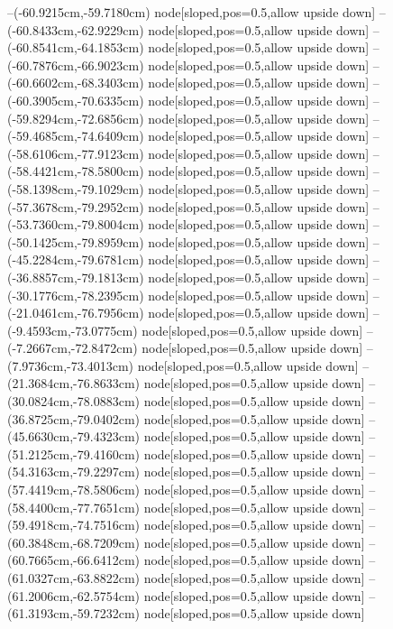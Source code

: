 --(-60.9215cm,-59.7180cm) node[sloped,pos=0.5,allow upside down]{\ArrowIn}
--(-60.8433cm,-62.9229cm) node[sloped,pos=0.5,allow upside down]{\ArrowIn}
--(-60.8541cm,-64.1853cm) node[sloped,pos=0.5,allow upside down]{\ArrowIn}
--(-60.7876cm,-66.9023cm) node[sloped,pos=0.5,allow upside down]{\ArrowIn}
--(-60.6602cm,-68.3403cm) node[sloped,pos=0.5,allow upside down]{\ArrowIn}
--(-60.3905cm,-70.6335cm) node[sloped,pos=0.5,allow upside down]{\ArrowIn}
--(-59.8294cm,-72.6856cm) node[sloped,pos=0.5,allow upside down]{\ArrowIn}
--(-59.4685cm,-74.6409cm) node[sloped,pos=0.5,allow upside down]{\ArrowIn}
--(-58.6106cm,-77.9123cm) node[sloped,pos=0.5,allow upside down]{\ArrowIn}
--(-58.4421cm,-78.5800cm) node[sloped,pos=0.5,allow upside down]{\arrowIn}
--(-58.1398cm,-79.1029cm) node[sloped,pos=0.5,allow upside down]{\arrowIn}
--(-57.3678cm,-79.2952cm) node[sloped,pos=0.5,allow upside down]{\arrowIn}
--(-53.7360cm,-79.8004cm) node[sloped,pos=0.5,allow upside down]{\ArrowIn}
--(-50.1425cm,-79.8959cm) node[sloped,pos=0.5,allow upside down]{\ArrowIn}
--(-45.2284cm,-79.6781cm) node[sloped,pos=0.5,allow upside down]{\ArrowIn}
--(-36.8857cm,-79.1813cm) node[sloped,pos=0.5,allow upside down]{\ArrowIn}
--(-30.1776cm,-78.2395cm) node[sloped,pos=0.5,allow upside down]{\ArrowIn}
--(-21.0461cm,-76.7956cm) node[sloped,pos=0.5,allow upside down]{\ArrowIn}
--(-9.4593cm,-73.0775cm) node[sloped,pos=0.5,allow upside down]{\ArrowIn}
--(-7.2667cm,-72.8472cm) node[sloped,pos=0.5,allow upside down]{\ArrowIn}
--(7.9736cm,-73.4013cm) node[sloped,pos=0.5,allow upside down]{\ArrowIn}
--(21.3684cm,-76.8633cm) node[sloped,pos=0.5,allow upside down]{\ArrowIn}
--(30.0824cm,-78.0883cm) node[sloped,pos=0.5,allow upside down]{\ArrowIn}
--(36.8725cm,-79.0402cm) node[sloped,pos=0.5,allow upside down]{\ArrowIn}
--(45.6630cm,-79.4323cm) node[sloped,pos=0.5,allow upside down]{\ArrowIn}
--(51.2125cm,-79.4160cm) node[sloped,pos=0.5,allow upside down]{\ArrowIn}
--(54.3163cm,-79.2297cm) node[sloped,pos=0.5,allow upside down]{\ArrowIn}
--(57.4419cm,-78.5806cm) node[sloped,pos=0.5,allow upside down]{\ArrowIn}
--(58.4400cm,-77.7651cm) node[sloped,pos=0.5,allow upside down]{\ArrowIn}
--(59.4918cm,-74.7516cm) node[sloped,pos=0.5,allow upside down]{\ArrowIn}
--(60.3848cm,-68.7209cm) node[sloped,pos=0.5,allow upside down]{\ArrowIn}
--(60.7665cm,-66.6412cm) node[sloped,pos=0.5,allow upside down]{\ArrowIn}
--(61.0327cm,-63.8822cm) node[sloped,pos=0.5,allow upside down]{\ArrowIn}
--(61.2006cm,-62.5754cm) node[sloped,pos=0.5,allow upside down]{\ArrowIn}
--(61.3193cm,-59.7232cm) node[sloped,pos=0.5,allow upside down]{\ArrowIn}
